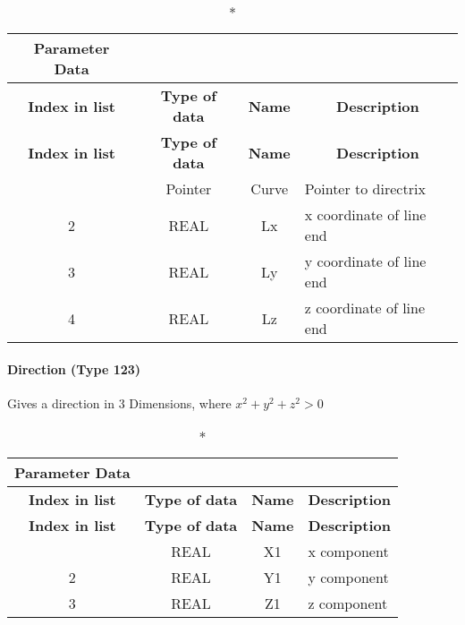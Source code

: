 \begin{longtable}[H]{|c|c|c|l|}
  \caption*{Parameter Data} \\

  \hline
  \multicolumn{1}{|c|}{\textbf{Index in list}} & \multicolumn{1}{|c|}{\textbf{Type of data}} &
  \multicolumn{1}{|c|}{\textbf{Name}} & \multicolumn{1}{|c|}{\textbf{Description}} \\ \hline
  \endfirsthead
  \hline
  \multicolumn{1}{|c|}{\textbf{Index in list}} & \multicolumn{1}{|c|}{\textbf{Type of data}} &
  \multicolumn{1}{|c|}{\textbf{Name}} & \multicolumn{1}{|c|}{\textbf{Description}} \\ \hline
  \endhead
  
  \endfoot

  \endlastfoot
1 & Pointer & Curve & Pointer to directrix\\ \hline
2 & REAL & Lx & x coordinate of line end\\ \hline
3 & REAL & Ly & y coordinate of line end\\ \hline
4 & REAL & Lz & z coordinate of line end\\ \hline
\end{longtable}

\paragraph{Direction (Type 123)}\label{direction-type-123}

Gives a direction in 3 Dimensions, where $x^2 + y^2 + z^2
> 0$

\begin{longtable}[H]{|c|c|c|l|}
  \caption*{Parameter Data} \\

  \hline
  \multicolumn{1}{|c|}{\textbf{Index in list}} & \multicolumn{1}{|c|}{\textbf{Type of data}} &
  \multicolumn{1}{|c|}{\textbf{Name}} & \multicolumn{1}{|c|}{\textbf{Description}} \\ \hline
  \endfirsthead
  \hline
  \multicolumn{1}{|c|}{\textbf{Index in list}} & \multicolumn{1}{|c|}{\textbf{Type of data}} &
  \multicolumn{1}{|c|}{\textbf{Name}} & \multicolumn{1}{|c|}{\textbf{Description}} \\ \hline
  \endhead
  
  \endfoot

  \endlastfoot
1 & REAL & X1 & x component\\ \hline
2 & REAL & Y1 & y component\\ \hline
3 & REAL & Z1 & z component\\ \hline
\end{longtable}

